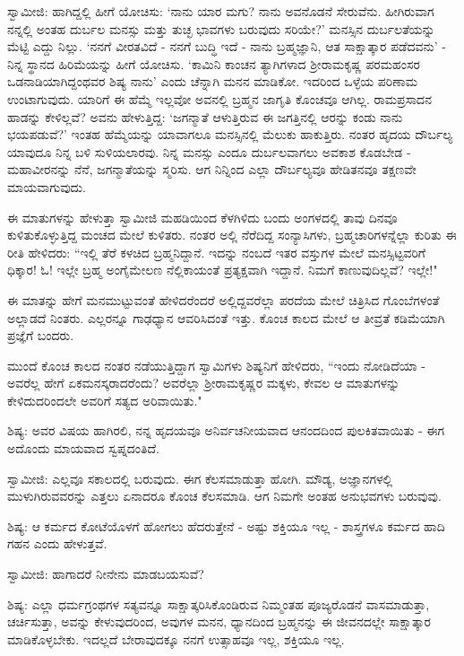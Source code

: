 ಸ್ವಾಮೀಜಿ: ಹಾಗಿದ್ದಲ್ಲಿ ಹೀಗೆ ಯೋಚಿಸು: ‘ನಾನು ಯಾರ ಮಗು? ನಾನು ಅವನೊಡನೆ ಸೇರುವೆನು. ಹೀಗಿರುವಾಗ ನನ್ನಲ್ಲಿ ಅಂತಹ ದುರ್ಬಲ ಮನಸ್ಸು ಮತ್ತು ತುಚ್ಛ ಭಾವಗಳು ಬರುವುದು ಸರಿಯೇ?’ ಮನಸ್ಸಿನ ದುರ್ಬಲತೆಯನ್ನು ಮೆಟ್ಟಿ ಎದ್ದು ನಿಲ್ಲು. ‘ನನಗೆ ವೀರತವಿದೆ - ನನಗೆ ಬುದ್ಧಿ ಇದೆ - ನಾನು ಬ್ರಹ್ಮಜ್ಞಾನಿ, ಆತ ಸಾಕ್ಷಾತ್ಕಾರ ಪಡೆದವನು’ - ನಿನ್ನ ಸ್ಥಾನದ ಹಿರಿಮೆಯನ್ನು ಹೀಗೆ ಯೋಚಿಸು. ‘ಕಾಮಿನಿ ಕಾಂಚನ ತ್ಯಾಗಿಗಳಾದ ಶ‍್ರೀರಾಮಕೃಷ್ಣ ಪರಮಹಂಸರ ಒಡನಾಡಿಯಾಗಿದ್ದಂಥವರ ಶಿಷ್ಯ ನಾನು’ ಎಂದು ಚೆನ್ನಾಗಿ ಮನನ ಮಾಡಿಕೋ. ಇದರಿಂದ ಒಳ್ಳೆಯ ಪರಿಣಾಮ ಉಂಟಾಗುವುದು. ಯಾರಿಗೆ ಈ ಹೆಮ್ಮೆ ಇಲ್ಲವೋ ಅವನಲ್ಲಿ ಬ್ರಹ್ಮನ ಜಾಗೃತಿ ಕೊಂಚವೂ ಆಗಿಲ್ಲ. ರಾಮಪ್ರಸಾದನ ಹಾಡನ್ನು ಕೇಳಿಲ್ಲವೆ? ಅವನು ಹೇಳುತ್ತಿದ್ದ: ‘ಜಗನ್ಮಾತೆ ಆಳುತ್ತಿರುವ ಈ ಜಗತ್ತಿನಲ್ಲಿ ಆರನ್ನು ಕಂಡು ನಾನು ಭಯಪಡುವೆ?’ ಇಂತಹ ಹೆಮ್ಮೆಯನ್ನು ಯಾವಾಗಲೂ ಮನಸ್ಸಿನಲ್ಲಿ ಮೆಲುಕು ಹಾಕುತ್ತಿರು. ನಂತರ ಹೃದಯ ದೌರ್ಬಲ್ಯ ಯಾವುದೂ ನಿನ್ನ ಬಳಿ ಸುಳಿಯಲಾರವು. ನಿನ್ನ ಮನಸ್ಸು ಎಂದೂ ದುರ್ಬಲವಾಗಲು ಅವಕಾಶ ಕೊಡಬೇಡ - ಮಹಾವೀರನನ್ನು ನೆನೆ, ಜಗನ್ಮಾತೆಯನ್ನು ಸ್ಮರಿಸು. ಆಗ ನಿನ್ನಿಂದ ಎಲ್ಲಾ ದೌರ್ಬಲ್ಯವೂ ಹೇಡಿತನವೂ ತಕ್ಷಣವೇ ಮಾಯವಾಗುವುದು.

ಈ ಮಾತುಗಳನ್ನು ಹೇಳುತ್ತಾ ಸ್ವಾಮೀಜಿ ಮಹಡಿಯಿಂದ ಕೆಳಗಿಳಿದು ಬಂದು ಅಂಗಳದಲ್ಲಿ ತಾವು ದಿನವೂ ಕುಳಿತುಕೊಳ್ಳುತ್ತಿದ್ದ ಮಂಚದ ಮೇಲೆ ಕುಳಿತರು. ನಂತರ ಅಲ್ಲಿ ನೆರೆದಿದ್ದ ಸಂನ್ಯಾಸಿಗಳು, ಬ್ರಹ್ಮಚಾರಿಗಳನ್ನೆಲ್ಲಾ ಕುರಿತು ಈ ರೀತಿ ಹೇಳಿದರು: “ಇಲ್ಲಿ ತೆರೆ ಕಳಚಿದ ಬ್ರಹ್ಮನಿದ್ದಾನೆ. ಇದನ್ನು ನಂಬದೆ ಇತರ ವಸ್ತುಗಳ ಮೇಲೆ ಮನಸ್ಸಿಟ್ಟವರಿಗೆ ಧಿಕ್ಕಾರ! ಓ! ಇಲ್ಲೇ ಬ್ರಹ್ಮ ಅಂಗೈಮೇಲಣ ನೆಲ್ಲಿಕಾಯಂತೆ ಪ್ರತ್ಯಕ್ಷವಾಗಿ ಇದ್ದಾನೆ. ನಿಮಗೆ ಕಾಣುವುದಿಲ್ಲವೆ? ಇಲ್ಲೇ!"

ಈ ಮಾತನ್ನು ಹೇಗೆ ಮನಮುಟ್ಟುವಂತೆ ಹೇಳಿದರೆಂದರೆ ಅಲ್ಲಿದ್ದವರೆಲ್ಲಾ ಪರದೆಯ ಮೇಲೆ ಚಿತ್ರಿಸಿದ ಗೊಂಬೆಗಳಂತೆ ಅಲ್ಲಾಡದೆ ನಿಂತರು. ಎಲ್ಲರನ್ನೂ ಗಾಢಧ್ಯಾನ ಆವರಿಸಿದಂತೆ ಇತ್ತು. ಕೊಂಚ ಕಾಲದ ಮೇಲೆ ಆ ತೀವ್ರತೆ ಕಡಿಮೆಯಾಗಿ ಪ್ರಜ್ಞೆಗೆ ಬಂದರು.

ಮುಂದೆ ಕೊಂಚ ಕಾಲದ ನಂತರ ನಡೆಯುತ್ತಿದ್ದಾಗ ಸ್ವಾಮಿಗಳು ಶಿಷ್ಯನಿಗೆ ಹೇಳಿದರು, “ಇಂದು ನೋಡಿದೆಯಾ - ಅವರೆಲ್ಲ ಹೇಗೆ ಏಕಮನಸ್ಕರಾದರೆಂದು? ಅವರೆಲ್ಲಾ ಶ‍್ರೀರಾಮಕೃಷ್ಣರ ಮಕ್ಕಳು, ಕೇವಲ ಆ ಮಾತುಗಳನ್ನು ಕೇಳಿದುದರಿಂದಲೇ ಅವರಿಗೆ ಸತ್ಯದ ಅರಿವಾಯಿತು."

ಶಿಷ್ಯ: ಅವರ ವಿಷಯ ಹಾಗಿರಲಿ, ನನ್ನ ಹೃದಯವೂ ಅನಿರ್ವಚನೀಯವಾದ ಆನಂದದಿಂದ ಪುಲಕಿತವಾಯಿತು - ಈಗ ಅದೊಂದು ಮಾಯವಾದ ಸ್ವಪ್ನದಂತಿದೆ.

ಸ್ವಾಮೀಜಿ: ಎಲ್ಲವೂ ಸಕಾಲದಲ್ಲಿ ಬರುವುದು. ಈಗ ಕೆಲಸಮಾಡುತ್ತಾ ಹೋಗಿ. ಮೌಡ್ಯ, ಅಜ್ಞಾನಗಳಲ್ಲಿ ಮುಳುಗಿರುವವರನ್ನು ಎತ್ತಲು ಏನಾದರೂ ಕೊಂಚ ಕೆಲಸಮಾಡಿ. ಆಗ ನಿಮಗೇ ಅಂತಹ ಅನುಭವಗಳು ಬರುವುವು.

ಶಿಷ್ಯ: ಆ ಕರ್ಮದ ಕೋಟೆಯೊಳಗೆ ಹೋಗಲು ಹೆದರುತ್ತೇನೆ - ಅಷ್ಟು ಶಕ್ತಿಯೂ ಇಲ್ಲ - ಶಾಸ್ತ್ರಗಳೂ ಕರ್ಮದ ಹಾದಿ ಗಹನ ಎಂದು ಹೇಳುತ್ತವೆ.

ಸ್ವಾಮೀಜಿ: ಹಾಗಾದರೆ ನೀನೇನು ಮಾಡಬಯಸುವೆ?

ಶಿಷ್ಯ: ಎಲ್ಲಾ ಧರ್ಮಗ್ರಂಥಗಳ ಸತ್ಯವನ್ನೂ ಸಾಕ್ಷಾತ್ಕರಿಸಿಕೊಂಡಿರುವ ನಿಮ್ಮಂತಹ ಪೂಜ್ಯರೊಡನೆ ವಾಸಮಾಡುತ್ತಾ, ಚರ್ಚಿಸುತ್ತಾ, ಅವನ್ನು ಕೇಳುವುದರಿಂದ, ಅವುಗಳ ಮನನ, ಧ್ಯಾನದಿಂದ ಬ್ರಹ್ಮನನ್ನು ಈ ಜೀವನದಲ್ಲೇ ಸಾಕ್ಷಾತ್ಕಾರ ಮಾಡಿಕೊಳ್ಳಬೇಕು. ಇದಲ್ಲದೆ ಬೇರಾವುದಕ್ಕೂ ನನಗೆ ಉತ್ಸಾಹವೂ ಇಲ್ಲ, ಶಕ್ತಿಯೂ ಇಲ್ಲ.


